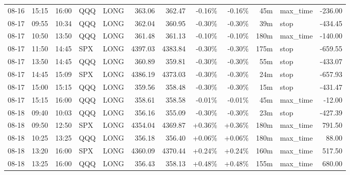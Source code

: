 \documentclass[11pt,a4paper,twoside]{article}
\begin{document}
\begin{center}
\begin{longtable}{>{\color{txtmain}}l l l l l r r r r r >{\color{txtmain}}l r}
08-16 & 15:15 & 16:00 & QQQ & LONG & 363.06 & 362.47 & \textcolor{lossred}{-0.16\%} & \textcolor{lossred}{-0.16\%} & 45m & max\_time & \textcolor{lossred}{-236.00} \\
08-17 & 09:55 & 10:34 & QQQ & LONG & 362.04 & 360.95 & \textcolor{lossred}{-0.30\%} & \textcolor{lossred}{-0.30\%} & 39m & stop & \textcolor{lossred}{-434.45} \\
08-17 & 10:50 & 13:50 & QQQ & LONG & 361.48 & 361.13 & \textcolor{lossred}{-0.10\%} & \textcolor{lossred}{-0.10\%} & 180m & max\_time & \textcolor{lossred}{-140.00} \\
08-17 & 11:50 & 14:45 & SPX & LONG & 4397.03 & 4383.84 & \textcolor{lossred}{-0.30\%} & \textcolor{lossred}{-0.30\%} & 175m & stop & \textcolor{lossred}{-659.55} \\
08-17 & 13:50 & 14:45 & QQQ & LONG & 360.89 & 359.81 & \textcolor{lossred}{-0.30\%} & \textcolor{lossred}{-0.30\%} & 55m & stop & \textcolor{lossred}{-433.07} \\
08-17 & 14:45 & 15:09 & SPX & LONG & 4386.19 & 4373.03 & \textcolor{lossred}{-0.30\%} & \textcolor{lossred}{-0.30\%} & 24m & stop & \textcolor{lossred}{-657.93} \\
08-17 & 15:00 & 15:15 & QQQ & LONG & 359.56 & 358.48 & \textcolor{lossred}{-0.30\%} & \textcolor{lossred}{-0.30\%} & 15m & stop & \textcolor{lossred}{-431.47} \\
08-17 & 15:15 & 16:00 & QQQ & LONG & 358.61 & 358.58 & \textcolor{lossred}{-0.01\%} & \textcolor{lossred}{-0.01\%} & 45m & max\_time & \textcolor{lossred}{-12.00} \\
08-18 & 09:40 & 10:03 & QQQ & LONG & 356.16 & 355.09 & \textcolor{lossred}{-0.30\%} & \textcolor{lossred}{-0.30\%} & 23m & stop & \textcolor{lossred}{-427.39} \\
08-18 & 09:50 & 12:50 & SPX & LONG & 4354.04 & 4369.87 & \textcolor{wingreen}{+0.36\%} & \textcolor{wingreen}{+0.36\%} & 180m & max\_time & \textcolor{wingreen}{791.50} \\
08-18 & 10:25 & 13:25 & QQQ & LONG & 356.18 & 356.40 & \textcolor{wingreen}{+0.06\%} & \textcolor{wingreen}{+0.06\%} & 180m & max\_time & \textcolor{wingreen}{88.00} \\
08-18 & 13:20 & 16:00 & SPX & LONG & 4360.09 & 4370.44 & \textcolor{wingreen}{+0.24\%} & \textcolor{wingreen}{+0.24\%} & 160m & max\_time & \textcolor{wingreen}{517.50} \\
08-18 & 13:25 & 16:00 & QQQ & LONG & 356.43 & 358.13 & \textcolor{wingreen}{+0.48\%} & \textcolor{wingreen}{+0.48\%} & 155m & max\_time & \textcolor{wingreen}{680.00} \\

\end{longtable}
\end{center}
\end{document}
